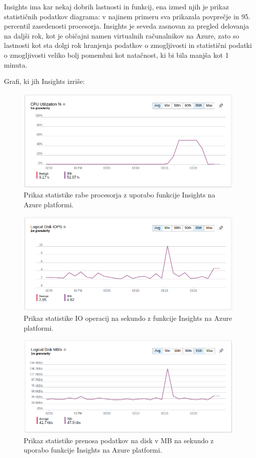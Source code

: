 Insights ima kar nekaj dobrih lastnosti in funkcij, ena izmed njih je prikaz statističnih podatkov diagrama: v najinem primeru sva prikazala povprečje in 95. percentil zasedenosti procesorja. Insights je seveda zasnovan za pregled delovanja na daljši rok, kot je običajni namen virtualnih računalnikov na Azure, zato so lastnosti kot sta dolgi rok hranjenja podatkov o zmogljivosti in statistični podatki o zmogljivosti veliko bolj pomembni kot natačnost, ki bi bila manjša kot 1 minuta.

Grafi, ki jih Insights izriše:

\begin{figure}[H]
	\centering
	\includegraphics[scale=0.46]{Img/insights_cpu.png}
	\caption{Prikaz statistike rabe procesorja z uporabo funkcije Insights na Azure platformi.}
	\label{fig:7_breme2}
\end{figure}

\begin{figure}[H]
	\centering
	\includegraphics[scale=0.46]{Img/insights_iops.png}
	\caption{Prikaz statistike IO operacij na sekundo z funkcije Insights na Azure platformi.}
	\label{fig:7_breme2}
\end{figure}

\begin{figure}[H]
	\centering
	\includegraphics[scale=0.46]{Img/insights_iombs.png}
	\caption{Prikaz statistike prenosa podatkov na disk v MB na sekundo z uporabo funkcije Insights na Azure platformi.}
	\label{fig:7_breme2}
\end{figure}

